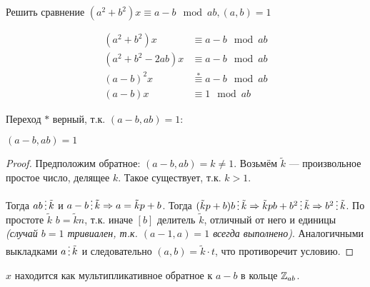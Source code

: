 \begin{exercise}
    Решить сравнение \((a^2 + b^2)x \equiv a - b \mod ab, (a, b) = 1\)
\end{exercise}
\begin{solution}
    \begin{align*}
        (a^2 + b^2)x       & \equiv a - b \mod ab               \\
        (a^2 + b^2 - 2ab)x & \equiv a - b \mod ab               \\
        (a - b)^2 x        & \stackrel{*}{\equiv} a - b \mod ab \\
        (a - b) x          & \equiv 1 \mod ab
    \end{align*}

    Переход \(*\) верный, т.к. \((a - b, ab) = 1\):

    \begin{statement}
        \((a - b, ab) = 1\)
    \end{statement}
    \begin{proof}
        Предположим обратное: \((a - b, ab) = k \neq 1\). Возьмём \(\tilde{k}\) --- произвольное простое число, делящее \(k\). Такое существует, т.к. \(k > 1\).

        Тогда \(ab \divided \tilde{k}\) и \(a - b \divided \tilde{k} \Rightarrow a = \tilde{k}p + b\). Тогда \((\tilde{k}p + b)b \divided \tilde{k} \Rightarrow \tilde{k}pb + b^2 \divided \tilde{k} \Rightarrow b^2 \divided \tilde{k}\). По простоте \(\tilde{k}\) \(b = \tilde{k}n\), т.к. иначе \([b]\) делитель \(\tilde{k}\), отличный от него и единицы \textit{(случай \(b = 1\) тривиален, т.к. \((a - 1, a) = 1\) всегда выполнено)}. Аналогичными выкладками \(a \divided \tilde{k}\) и следовательно \((a, b) = \tilde{k} \cdot t\), что противоречит условию.
    \end{proof}

    \(x\) находится как мультипликативное обратное к \(a - b\) в кольце \(\mathbb{Z}_{ab}\).
\end{solution}


